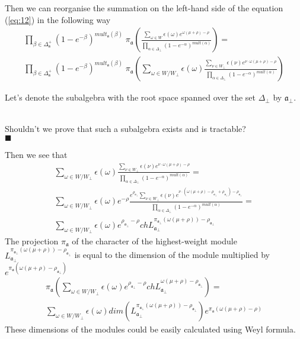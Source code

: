 \documentclass[a4paper,12pt]{article}
\theoremstyle{definition} \newtheorem{Def}{Definition}
\newenvironment{comment}
{\par\noindent{\bf TODO}\\}
{\\\hfill$\scriptstyle\blacksquare$\par}
\begin{document}
Then we can reorganise the summation on the left-hand side of the equation (\ref{eq:12}) in the following way
\begin{multline}
  \label{eq:13}
   \prod_{\beta\in \Delta_{\mathfrak{a}}^{+}}(1-e^{-\beta})^{mult_{\mathfrak{a}}(\beta)}  \;\pi_{\mathfrak{a}}\left(\frac{\sum_{\omega\in W} \epsilon(\omega) e^{\omega(\mu+\rho)-\rho}}{\prod_{\alpha\in\Delta_{\bot}}(1-e^{-\alpha})^{mult(\alpha)}}\right) = \\
   \prod_{\beta\in \Delta_{\mathfrak{a}}^{+}}(1-e^{-\beta})^{mult_{\mathfrak{a}}(\beta)}  \;\pi_{\mathfrak{a}}\left(\sum_{\omega\in W/W_{\bot}} \epsilon(\omega) \frac{\sum_{\nu\in W_{\bot}}\epsilon(\nu) e^{\nu \cdot \omega(\mu+\rho)-\rho}}{\prod_{\alpha\in\Delta_{\bot}}(1-e^{-\alpha})^{mult(\alpha)}}\right) 
\end{multline}

Let's denote the subalgebra with the root space spanned over the set $\Delta_{\bot}$ by $\mathfrak{a}_{\bot}$.
\begin{comment}
  Shouldn't we prove that such a subalgebra exists and is tractable?
\end{comment}
Then we see that
\begin{multline}
  \label{eq:14}
  \sum_{\omega\in W/W_{\bot}} \epsilon(\omega) \frac{\sum_{\nu\in W_{\bot}}\epsilon(\nu) e^{\nu \cdot \omega(\mu+\rho)-\rho}}{\prod_{\alpha\in\Delta_{\bot}}(1-e^{-\alpha})^{mult(\alpha)}} =\\
  \sum_{\omega\in W/W_{\bot}} \epsilon(\omega) e^{-\rho} \frac{e^{\rho_{\mathfrak{a}_{\bot}} }\sum_{\nu\in W_{\bot}}\epsilon(\nu) e^{\nu \cdot (\omega(\mu+\rho)-\rho_{\mathfrak{a}_{\bot}}+\rho_{\mathfrak{a}_{\bot}})-\rho_{\mathfrak{a}_{\bot}}}}{\prod_{\alpha\in\Delta_{\bot}}(1-e^{-\alpha})^{mult(\alpha)}}=\\
  \sum_{\omega\in W/W_{\bot}} \epsilon(\omega) e^{\rho_{\mathfrak{a}_{\bot}}-\rho} ch L^{\pi_{\mathfrak{a}_{\bot}}(\omega(\mu+\rho))-\rho_{\mathfrak{a}_{\bot}}}_{\mathfrak{a}_{\bot}}
\end{multline}
The projection $\pi_{\mathfrak{a}}$ of the character of the highest-weight module $L^{\pi_{\mathfrak{a}_{\bot}}(\omega(\mu+\rho))-\rho_{\mathfrak{a}_{\bot}}}_{\mathfrak{a}_{\bot}}$ is equal to the dimension of the module multiplied by $e^{\pi_{\mathfrak{a}}(\omega(\mu+\rho)-\rho_{\mathfrak{a}_{\bot}})}$
  \begin{multline}
    \label{eq:15}
    \pi_{\mathfrak{a}}\left(\sum_{\omega\in W/W_{\bot}} \epsilon(\omega) e^{\rho_{\mathfrak{a}_{\bot}}-\rho} ch L^{\omega(\mu+\rho)-\rho_{\mathfrak{a}_{\bot}}}_{\mathfrak{a}_{\bot}}\right) = \\
    \sum_{\omega\in W/W_{\bot}} \epsilon(\omega) dim\left(L^{\pi_{\mathfrak{a}_{\bot}}(\omega(\mu+\rho))-\rho_{\mathfrak{a}_{\bot}}}_{\mathfrak{a}_{\bot}}\right) e^{\pi_{\mathfrak{a}}(\omega(\mu+\rho)-\rho)}
  \end{multline}
These dimensions of the modules could be easily calculated using Weyl formula.
\end{document}
